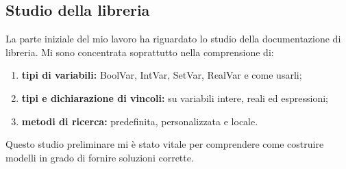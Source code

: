 \subsection{Studio della libreria}
La parte iniziale del mio lavoro ha riguardato lo studio della documentazione di libreria. Mi sono concentrata soprattutto nella comprensione di:
\begin{enumerate}
\item \textbf{tipi di variabili:}  BoolVar, IntVar, SetVar, RealVar e come usarli;
\item \textbf{tipi e dichiarazione di vincoli:} su variabili intere, reali ed espressioni;
\item \textbf{metodi di ricerca:} predefinita, personalizzata e locale.
\end{enumerate}
\noindent
Questo studio preliminare mi \`e stato vitale per comprendere come costruire modelli in grado di fornire soluzioni corrette.

